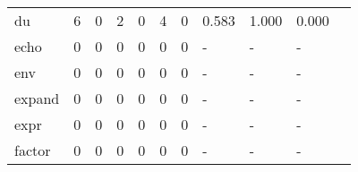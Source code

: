 \begin{longtable}{lp{1.2cm}p{1.2cm}p{1.2cm}p{1.2cm}p{1.2cm}p{1.2cm}p{1.2cm}p{1.2cm}p{1.2cm}p{1.2cm}}
du        &                                     6 &                                                  0 &                                                  2 &                                                  0 &                                                  4 &                                                  0 &                                              0.583 &                                              1.000 &                                              0.000 \\
echo      &                                     0 &                                                  0 &                                                  0 &                                                  0 &                                                  0 &                                                  0 &                                                  - &                                                  - &                                                  - \\
env       &                                     0 &                                                  0 &                                                  0 &                                                  0 &                                                  0 &                                                  0 &                                                  - &                                                  - &                                                  - \\
expand    &                                     0 &                                                  0 &                                                  0 &                                                  0 &                                                  0 &                                                  0 &                                                  - &                                                  - &                                                  - \\
expr      &                                     0 &                                                  0 &                                                  0 &                                                  0 &                                                  0 &                                                  0 &                                                  - &                                                  - &                                                  - \\
factor    &                                     0 &                                                  0 &                                                  0 &                                                  0 &                                                  0 &                                                  0 &                                                  - &                                                  - &                                                  - \\

\end{longtable}
